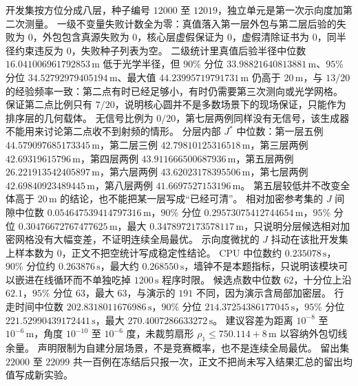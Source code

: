 开发集按方位分成八层，种子编号 $12000$ 至 $12019$，独立单元是第一次示向度加第二次测量。
一级不变量失败计数全为零：真值落入第一层外包与第二层后验的失败为 $0$，外包包含真源失败为 $0$，核心层虚假保证为 $0$，虚假清除证书为 $0$，同半径约束违反为 $0$，失败种子列表为空。
二级统计里真值后验半径中位数 $16.041006961792853\,\mathrm{m}$ 低于光学半径，但 $90\%$ 分位 $33.98821640813881\,\mathrm{m}$、$95\%$ 分位 $34.52792979405194\,\mathrm{m}$、最大值 $44.23995719791731\,\mathrm{m}$ 仍高于 $20\,\mathrm{m}$，与 $13/20$ 的经验频率一致：第二点有时已经足够小，有时仍需要第三次测向或光学网格。
保证第二点比例只有 $7/20$，说明核心圆并不是多数场景下的现场保证，只能作为排序层的几何载体。
无信号比例为 $0/20$，第七层两例同样没有无信号，该生成器不能用来讨论第二点收不到射频的情形。
分层内部 $J^\ast$ 中位数：第一层五例 $44.579097685173345\,\mathrm{m}$，第二层三例 $42.79810125316518\,\mathrm{m}$，第三层两例 $42.69319615796\,\mathrm{m}$，第四层两例 $43.911666500687936\,\mathrm{m}$，第五层两例 $26.221913542405897\,\mathrm{m}$，第六层两例 $43.62023178395506\,\mathrm{m}$，第七层两例 $42.69840923489445\,\mathrm{m}$，第八层两例 $41.6697527153196\,\mathrm{m}$。
第五层较低并不改变全体高于 $20\,\mathrm{m}$ 的结论，也不能把某一层写成“已经可清”。
相对加密参考集的 $J$ 间隙中位数 $0.054647539414797316\,\mathrm{m}$，$90\%$ 分位 $0.29573075412744654\,\mathrm{m}$，$95\%$ 分位 $0.30476672767477625\,\mathrm{m}$，最大 $0.3478972173578117\,\mathrm{m}$，只说明分层候选相对加密网格没有大幅变差，不证明连续全局最优。
示向度微扰的 $J$ 抖动在该批开发集上样本数为 $0$，正文不把空统计写成稳定性结论。
CPU 中位数约 $0.235078\,\mathrm{s}$，$90\%$ 分位约 $0.263876\,\mathrm{s}$，最大约 $0.268550\,\mathrm{s}$，墙钟不是本题指标，只说明该模块可以嵌进在线循环而不单独吃掉 $1200\,\mathrm{s}$ 程序时限。
候选点数中位数 $62$，十分位上沿 $62.1$，$95\%$ 分位 $63$，最大 $63$，与演示的 $191$ 不同，因为演示含局部加密层。
行走时间中位数 $202.8318011676986\,\mathrm{s}$，$90\%$ 分位 $214.37254386177045\,\mathrm{s}$，$95\%$ 分位 $221.52990439172441\,\mathrm{s}$，最大 $270.4007286633272\,\mathrm{s}$。
建议容差为距离 $10^{-8}$ 至 $10^{-6}\,\mathrm{m}$，角度 $10^{-10}$ 至 $10^{-6}$ 度，未裁剪扇形 $\rho_1\le 750.114+8\,\mathrm{m}$ 以容纳外包切线余量。
声明限制为自建分层场景，不是竞赛概率，也不是连续全局最优。
留出集 $22000$ 至 $22099$ 共一百例在冻结后只报一次，正文不把尚未写入结果汇总的留出均值写成新实验。

